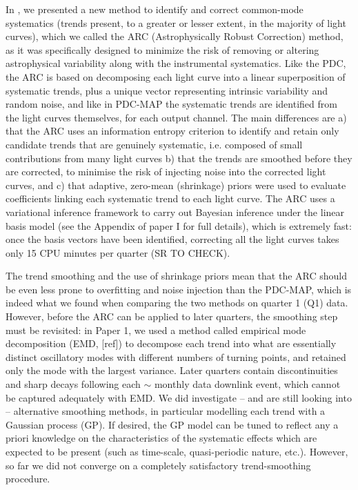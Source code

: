 \documentclass[useAMS,usenatbib]{mn2e}
\begin{document}
In \citet[][hereafter Paper I]{rob+13}, we presented a new method to
identify and correct common-mode systematics (trends present, to a
greater or lesser extent, in the majority of light curves), which we
called the ARC (Astrophysically Robust Correction) method, as it was
specifically designed to minimize the risk of removing or altering
astrophysical variability along with the instrumental
systematics. Like the PDC, the ARC is based on decomposing each light
curve into a linear superposition of systematic trends, plus a unique
vector representing intrinsic variability and random noise, and like
in PDC-MAP the systematic trends are identified from the light curves
themselves, for each output channel. The main differences are a) that
the ARC uses an information entropy criterion to identify and retain
only candidate trends that are genuinely systematic, i.e. composed of
small contributions from many light curves b) that the trends are
smoothed before they are corrected, to minimise the risk of
injecting noise into the corrected light curves, and c) that adaptive,
zero-mean (shrinkage) priors were used to evaluate coefficients
linking each systematic trend to each light curve. The ARC uses a
variational inference framework to carry out Bayesian inference under the linear basis
model (see the Appendix of paper I for full details), which is
extremely fast: once the basis vectors have been identified,
correcting all the light curves takes only 15 CPU minutes per quarter (SR TO CHECK).

The trend smoothing and the use of shrinkage priors mean that the ARC should be
even less prone to overfitting and noise injection than the PDC-MAP,
which is indeed what we found when comparing the two methods on
quarter 1 (Q1) data. However, before the ARC can be applied to later
quarters, the smoothing step must be revisited: in Paper 1, we used a
method called empirical mode decomposition (EMD, [ref]) to decompose
each trend into what are essentially distinct oscillatory modes with
different numbers of turning points, and retained only the mode with
the largest variance. Later quarters contain discontinuities and sharp
decays following each $\sim$ monthly data downlink event, which cannot
be captured adequately with EMD. We did investigate -- and are still
looking into -- alternative smoothing methods, in particular
modelling each trend with a Gaussian process (GP). If desired, the GP
model can be tuned to reflect any a priori knowledge on the
characteristics of the systematic effects which are expected to be
present (such as time-scale, quasi-periodic nature,
etc.). However, so far we did not converge on a completely
satisfactory trend-smoothing procedure.
\end{document}
